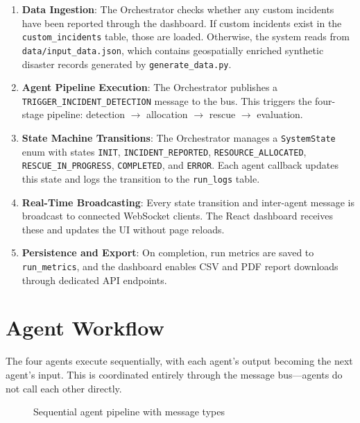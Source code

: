 \begin{enumerate}[leftmargin=*]
    \item \textbf{Data Ingestion}: The Orchestrator checks whether any custom incidents have been reported through the dashboard. If custom incidents exist in the \texttt{custom\_incidents} table, those are loaded. Otherwise, the system reads from \texttt{data/input\_data.json}, which contains geospatially enriched synthetic disaster records generated by \texttt{generate\_data.py}.

    \item \textbf{Agent Pipeline Execution}: The Orchestrator publishes a \texttt{TRIGGER\_INCIDENT\_DETECTION} message to the bus. This triggers the four-stage pipeline: detection $\rightarrow$ allocation $\rightarrow$ rescue $\rightarrow$ evaluation.

    \item \textbf{State Machine Transitions}: The Orchestrator manages a \texttt{SystemState} enum with states \texttt{INIT}, \texttt{INCIDENT\_REPORTED}, \texttt{RESOURCE\_ALLOCATED}, \texttt{RESCUE\_IN\_PROGRESS}, \texttt{COMPLETED}, and \texttt{ERROR}. Each agent callback updates this state and logs the transition to the \texttt{run\_logs} table.

    \item \textbf{Real-Time Broadcasting}: Every state transition and inter-agent message is broadcast to connected WebSocket clients. The React dashboard receives these and updates the UI without page reloads.

    \item \textbf{Persistence and Export}: On completion, run metrics are saved to \texttt{run\_metrics}, and the dashboard enables CSV and PDF report downloads through dedicated API endpoints.
\end{enumerate}

\section{Agent Workflow}
\label{sec:agent_workflow}

The four agents execute sequentially, with each agent's output becoming the next agent's input. This is coordinated entirely through the message bus---agents do not call each other directly.

\begin{figure}[H]
\centering
{}
\caption{Sequential agent pipeline with message types}
\label{fig:agent_pipeline}
\end{figure}

